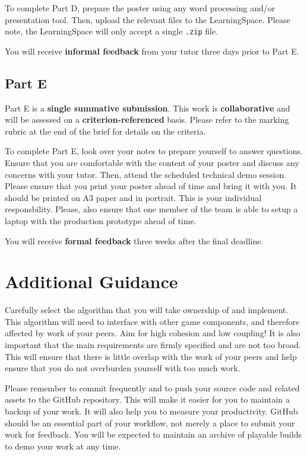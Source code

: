 \documentclass{../fal_assignment}
\begin{document}
To complete Part D, prepare the poster using any word processing and/or presentation tool. Then, upload the relevant files to the LearningSpace. Please note, the LearningSpace will only accept a single \texttt{.zip} file.

You will receive \textbf{informal feedback} from your tutor three days prior to Part E.

\subsection*{Part E}

Part E is a \textbf{single summative submission}. This work is \textbf{collaborative} and will be assessed on a \textbf{criterion-referenced} basis. Please refer to the marking rubric at the end of the brief for details on the criteria.

To complete Part E, look over your notes to prepare yourself to answer questions. Ensure that you are comfortable with the content of your poster and discuss any concerns with your tutor. Then, attend the scheduled technical demo session. Please ensure that you print your poster ahead of time and bring it with you. It should be printed on A3 paper and in portrait. This is your individual responsbility. Please, also ensure that one member of the team is able to setup a laptop with the production prototype ahead of time.

You will receive \textbf{formal feedback} three weeks after the final deadline.

\section*{Additional Guidance}

Carefully select the algorithm that you will take ownership of and implement. This algorithm will need to interface with other game components, and therefore affected by work of your peers. Aim for high cohesion and low coupling! It is also important that the main requirements are firmly specified and are not too broad. This will ensure that there is little overlap with the work of your peers and help ensure that you do not overburden yourself with too much work. 

Please remember to commit frequently and to push your source code and related assets to the GitHub repository. This will make it easier for you to maintain a backup of your work. It will also help you to measure your productivity. GitHub should be an essential part of your workflow, not merely a place to submit your work for feedback. You will be expected to maintain an archive of playable builds to demo your work at any time.
\end{document}
